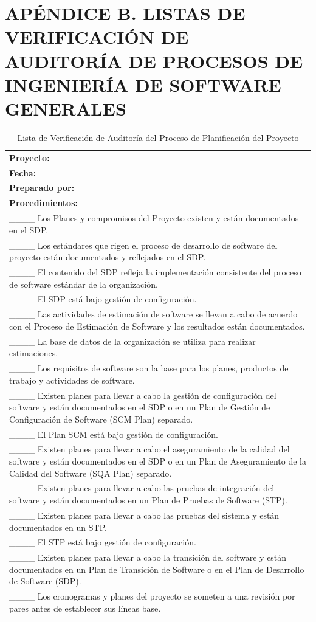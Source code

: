 ﻿\section{APÉNDICE B. LISTAS DE VERIFICACIÓN DE AUDITORÍA DE PROCESOS DE INGENIERÍA DE SOFTWARE GENERALES}

\begin{table}[H]
\centering
\caption{Lista de Verificación de Auditoría del Proceso de Planificación del Proyecto}
\label{fig:b1}
\begin{tabular}{|p{14cm}|}
\hline
\textbf{Proyecto:} \\
\textbf{Fecha:} \\
\textbf{Preparado por:} \\
\hline
\textbf{Procedimientos:} \\
\_\_\_\_ Los Planes y compromisos del Proyecto existen y están documentados en el SDP. \\
\_\_\_\_ Los estándares que rigen el proceso de desarrollo de software del proyecto están documentados y reflejados en el SDP. \\
\_\_\_\_ El contenido del SDP refleja la implementación consistente del proceso de software estándar de la organización. \\
\_\_\_\_ El SDP está bajo gestión de configuración. \\
\_\_\_\_ Las actividades de estimación de software se llevan a cabo de acuerdo con el Proceso de Estimación de Software y los resultados están documentados. \\
\_\_\_\_ La base de datos de la organización se utiliza para realizar estimaciones. \\
\_\_\_\_ Los requisitos de software son la base para los planes, productos de trabajo y actividades de software. \\
\_\_\_\_ Existen planes para llevar a cabo la gestión de configuración del software y están documentados en el SDP o en un Plan de Gestión de Configuración de Software (SCM Plan) separado. \\
\_\_\_\_ El Plan SCM está bajo gestión de configuración. \\
\_\_\_\_ Existen planes para llevar a cabo el aseguramiento de la calidad del software y están documentados en el SDP o en un Plan de Aseguramiento de la Calidad del Software (SQA Plan) separado. \\
\_\_\_\_ Existen planes para llevar a cabo las pruebas de integración del software y están documentados en un Plan de Pruebas de Software (STP). \\
\_\_\_\_ Existen planes para llevar a cabo las pruebas del sistema y están documentados en un STP. \\
\_\_\_\_ El STP está bajo gestión de configuración. \\
\_\_\_\_ Existen planes para llevar a cabo la transición del software y están documentados en un Plan de Transición de Software o en el Plan de Desarrollo de Software (SDP). \\
\_\_\_\_ Los cronogramas y planes del proyecto se someten a una revisión por pares antes de establecer sus líneas base. \\
\hline
\end{tabular}
\end{table}


